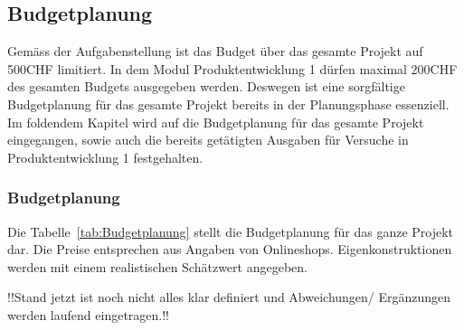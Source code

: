 \documentclass[main.tex]{subfiles} %
\begin{document}
\begin{landscape}
\subsection{Budgetplanung}

Gemäss der Aufgabenstellung ist das Budget über das gesamte Projekt auf 500CHF limitiert.
In dem Modul Produktentwicklung 1 dürfen maximal 200CHF des gesamten Budgets ausgegeben werden.
Deswegen ist eine sorgfältige Budgetplanung für das gesamte Projekt bereits in der Planungsphase
essenziell. Im foldendem Kapitel wird auf die Budgetplanung für das gesamte Projekt eingegangen,
sowie auch die bereits getätigten Ausgaben für Versuche in Produktentwicklung 1 festgehalten.

\subsubsection{Budgetplanung}
Die Tabelle~\ref{tab:Budgetplanung} stellt die Budgetplanung für das ganze Projekt dar. Die Preise 
entsprechen aus Angaben von Onlineshops. Eigenkonstruktionen werden mit einem realistischen 
Schätzwert angegeben.

!!Stand jetzt ist noch nicht alles klar definiert und Abweichungen/ Ergänzungen werden laufend eingetragen.!!


\end{landscape}
\end{document}
